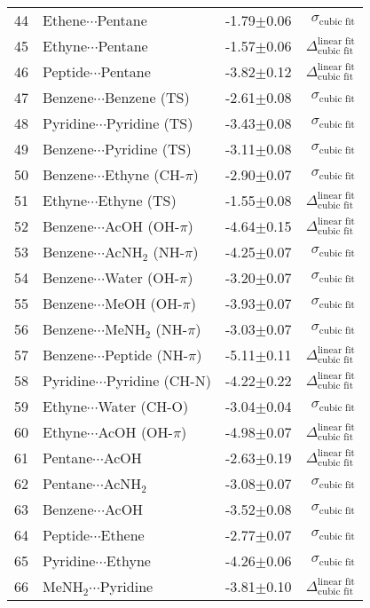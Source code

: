 \begin{longtable}{llrr}
44 & Ethene$\cdots$Pentane & -1.79$\pm$0.06 & $\sigma_\text{cubic fit}$ \\
45 & Ethyne$\cdots$Pentane & -1.57$\pm$0.06 & $\Delta_\text{cubic fit}^\text{linear fit}$ \\
46 & Peptide$\cdots$Pentane & -3.82$\pm$0.12 & $\Delta_\text{cubic fit}^\text{linear fit}$ \\
47 & Benzene$\cdots$Benzene (TS) & -2.61$\pm$0.08 & $\sigma_\text{cubic fit}$ \\
48 & Pyridine$\cdots$Pyridine (TS) & -3.43$\pm$0.08 & $\sigma_\text{cubic fit}$ \\
49 & Benzene$\cdots$Pyridine (TS) & -3.11$\pm$0.08 & $\sigma_\text{cubic fit}$ \\
50 & Benzene$\cdots$Ethyne (CH-$\pi$) & -2.90$\pm$0.07 & $\sigma_\text{cubic fit}$ \\
51 & Ethyne$\cdots$Ethyne (TS) & -1.55$\pm$0.08 & $\Delta_\text{cubic fit}^\text{linear fit}$ \\
52 & Benzene$\cdots$AcOH (OH-$\pi$) & -4.64$\pm$0.15 & $\Delta_\text{cubic fit}^\text{linear fit}$ \\
53 & Benzene$\cdots$AcNH$_2$ (NH-$\pi$) & -4.25$\pm$0.07 & $\sigma_\text{cubic fit}$ \\
54 & Benzene$\cdots$Water (OH-$\pi$) & -3.20$\pm$0.07 & $\sigma_\text{cubic fit}$ \\
55 & Benzene$\cdots$MeOH (OH-$\pi$) & -3.93$\pm$0.07 & $\sigma_\text{cubic fit}$ \\
56 & Benzene$\cdots$MeNH$_2$ (NH-$\pi$) & -3.03$\pm$0.07 & $\sigma_\text{cubic fit}$ \\
57 & Benzene$\cdots$Peptide (NH-$\pi$) & -5.11$\pm$0.11 & $\Delta_\text{cubic fit}^\text{linear fit}$ \\
58 & Pyridine$\cdots$Pyridine (CH-N) & -4.22$\pm$0.22 & $\Delta_\text{cubic fit}^\text{linear fit}$ \\
59 & Ethyne$\cdots$Water (CH-O) & -3.04$\pm$0.04 & $\sigma_\text{cubic fit}$ \\
60 & Ethyne$\cdots$AcOH (OH-$\pi$) & -4.98$\pm$0.07 & $\Delta_\text{cubic fit}^\text{linear fit}$ \\
61 & Pentane$\cdots$AcOH & -2.63$\pm$0.19 & $\Delta_\text{cubic fit}^\text{linear fit}$ \\
62 & Pentane$\cdots$AcNH$_2$ & -3.08$\pm$0.07 & $\sigma_\text{cubic fit}$ \\
63 & Benzene$\cdots$AcOH & -3.52$\pm$0.08 & $\sigma_\text{cubic fit}$ \\
64 & Peptide$\cdots$Ethene & -2.77$\pm$0.07 & $\sigma_\text{cubic fit}$ \\
65 & Pyridine$\cdots$Ethyne & -4.26$\pm$0.06 & $\sigma_\text{cubic fit}$ \\
66 & MeNH$_2$$\cdots$Pyridine & -3.81$\pm$0.10 & $\Delta_\text{cubic fit}^\text{linear fit}$ \\
\end{longtable}